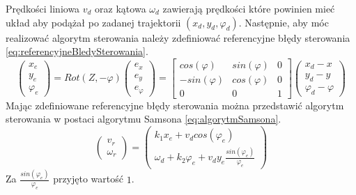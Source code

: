         Prędkości liniowa $v_{d}$ oraz kątowa $\omega_{d}$ zawierają prędkości które powinien mieć układ aby podążał po zadanej trajektorii $(x_{d}, y_{d}, \varphi_{d})$. Następnie, aby móc realizować algorytm sterowania należy zdefiniować referencyjne błędy sterowania \ref{eq:referencyjneBledySterowania}.
        \begin{equation}
            \left(\begin{array}{c}
                x_{e} \\
                y_{e} \\
                \varphi_{e}
            \end{array}\right)
            = Rot(Z, -\varphi) 
            \left(\begin{array}{c}
                e_{x} \\
                e_{y} \\
                e_{\varphi}
            \end{array}\right)
            =
            \begin{bmatrix}
                cos(\varphi) & sin(\varphi) & 0 \\
                -sin(\varphi) & cos(\varphi) & 0 \\
                0 & 0 & 1
            \end{bmatrix}
             \left(\begin{array}{c}
                x_{d} - x \\
                y_{d} - y \\
                \varphi_{d} - \varphi
            \end{array}\right)
            \label{eq:referencyjneBledySterowania}
        \end{equation}
        Mając zdefiniowane referencyjne błędy sterowania można przedstawić algorytm sterowania w postaci algorytmu Samsona \ref{eq:algorytmSamsona}.
        \begin{equation}
            \left(\begin{array}{c}
                v_{r} \\
                \omega_{r} 
            \end{array}\right)
            =
            \left(\begin{array}{c}
                k_{1}x_{e} + v_{d}cos(\varphi_{e}) \\
                \omega_{d} + k_{2}\varphi_{e} + v_{d}y_{e}\frac{sin(\varphi_{e})}{\varphi_{e}}
            \end{array}\right)
            \label{eq:algorytmSamsona}
        \end{equation}
        Za $\frac{sin(\varphi_{e})}{\varphi_{e}}$ przyjęto wartość $1$.

